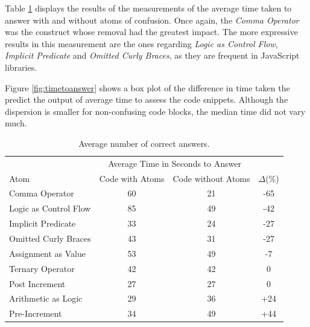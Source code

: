 
Table \ref{tab:difference-time-taken} displays the results of the measurements of the average time taken to answer with and without atoms of confusion. Once again, the \emph{Comma Operator} was the construct whose removal had the greatest impact. The more expressive results in this measurement are the ones regarding \emph{Logic as Control Flow}, \emph{Implicit Predicate} and \emph{Omitted Curly Braces}, {\color{blue}as they are frequent in JavaScript libraries}. 


Figure \ref{fig:timetoanswer} shows a box plot of the difference in time taken the predict the output of average time to assess the code snippets. Although the dispersion is smaller for non-confusing code blocks, the median time did not vary much.


\begin{table}[htbp]
\caption{Average number of correct answers.}
\label{tab:difference-time-taken}
\begin{tabular}{lccc} \toprule
 & \multicolumn{2}{c}{Average Time in Seconds to Answer} & \\ [0.1cm]
 Atom & Code with Atoms & Code without Atoms & $\Delta$(\%) \\ \midrule 
Comma Operator        & 60 & 21  & -65  \\
Logic as Control Flow & 85 & 49  & -42  \\
Implicit Predicate    & 33 & 24  & -27  \\
Omitted Curly Braces  & 43 & 31  & -27  \\
Assignment as Value   & 53 & 49  & -7   \\
Ternary Operator      & 42 & 42  & 0    \\
Post Increment        & 27 & 27  & 0    \\
Arithmetic as Logic   & 29 & 36  & +24  \\
Pre-Increment         & 34 & 49  & +44  \\
         \bottomrule
    \end{tabular}
\end{table}

